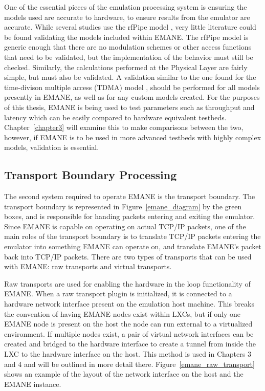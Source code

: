 One of the essential pieces of the emulation processing system is ensuring the models used are accurate to hardware, to ensure results from the emulator are accurate.
While several studies use the rfPipe model \cite{rfPipe1, rfPipe2, rfPipe3}, very little literature could be found validating the models included within EMANE.
The rfPipe model is generic enough that there are no modulation schemes or other access functions that need to be validated, but the implementation of the behavior must still be checked.
Similarly, the calculations performed at the Physical Layer are fairly simple, but must also be validated.
A validation similar to the one found for the time-divison multiple access (TDMA) model \cite{emane_tdma}, should be performed for all models presently in EMANE, as well as for any custom models created.
For the purposes of this thesis, EMANE is being used to test parameters such as throughput and latency which can be easily compared to hardware equivalent testbeds.
Chapter~\ref{chapter3} will examine this to make comparisons between the two, however, if EMANE is to be used in more advanced testbeds with highly complex models, validation is essential.

\subsection{Transport Boundary Processing}
The second system required to operate EMANE is the transport boundary.
The transport boundary is represented in Figure~\ref{emane_diagram} by the green boxes, and is responsible for handing packets entering and exiting the emulator.
Since EMANE is capable on operating on actual TCP/IP packets, one of the main roles of the transport boundary is to translate TCP/IP packets entering the emulator into something EMANE can operate on, and translate EMANE's packet back into TCP/IP packets.
There are two types of transports that can be used with EMANE: raw transports and virtual transports.\par
Raw transports are used for enabling the hardware in the loop functionality of EMANE.
When a raw transport plugin is initialized, it is connected to a hardware network interface present on the emulation host machine.
This breaks the convention of having EMANE nodes exist within LXCs, but if only one EMANE node is present on the host the node can run external to a virtualized environment.
If multiple nodes exist, a pair of virtual network interfaces can be created and bridged to the hardware interface to create a tunnel from inside the LXC to the hardware interface on the host.
This method is used in Chapters 3 and 4 and will be outlined in more detail there.
Figure~\ref{emane_raw_transport} shows an example of the layout of the network interface on the host and the EMANE instance.

